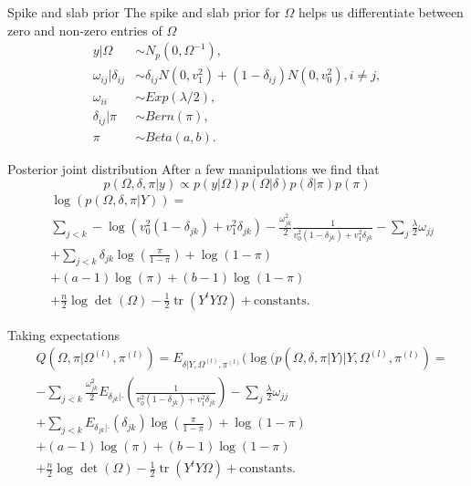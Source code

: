 \documentclass{beamer}
\DeclareMathOperator{\tr}{tr}
\begin{document}
\begin{frame}{Spike and slab prior}
	The spike and slab prior for $\Omega$ helps us differentiate between zero
	and non-zero entries of $\Omega$
	\begin{align*}
		y | \Omega                & \sim N_p(0, \Omega^{-1}),                                               \\
		\omega_{ij} | \delta_{ij} & \sim \delta_{ij} N(0, v_1^2) + (1 - \delta_{ij}) N(0, v_0^2), i \neq j, \\
		\omega_{ii}               & \sim Exp(\lambda/2),                                                    \\
		\delta_{ij} | \pi         & \sim Bern(\pi),                                                         \\
		\pi                       & \sim Beta(a,b).
	\end{align*}
\end{frame}
\begin{frame}{Posterior joint distribution}
	After a few manipulations we find that
	\[ p(\Omega, \delta, \pi | y) \propto p(y | \Omega) p(\Omega | \delta) p(\delta | \pi) p(\pi) \]
	\begin{align*}
		 & \log(p(\Omega, \delta, \pi | Y)) =                                   \\
		 & \sum_{j<k} -\log(v_0^2 (1 - \delta_{jk}) + v_1^2 \delta_{jk})
		- \frac{\omega_{jk}^2}{2} \frac{1}{v_0^2 (1 - \delta_{jk}) + v_1^2
		\delta_{jk}} - \sum_j \frac{\lambda}{2} \omega_{jj}                     \\
		 & + \sum_{j<k} \delta_{jk} \log\left(\frac{\pi}{1-\pi}\right) + \log(1
		- \pi)                                                                  \\
		 & + (a - 1) \log(\pi) + (b - 1) \log(1 - \pi)                          \\
		 & + \frac{n}{2} \log\det(\Omega) - \frac{1}{2} \tr(Y^t Y \Omega)
		+ \text{constants.}
	\end{align*}
\end{frame}
\begin{frame}{Taking expectations}
	\begin{align*}
		 & Q(\Omega, \pi | \Omega^{(l)}, \pi^{(l)}) = E_{\delta | Y, \Omega^{(l)},
		\pi^{(l)}}(\log(p(\Omega, \delta, \pi | Y) | Y, \Omega^{(l)}, \pi^{(l)} ) =                                   \\
		 & - \sum_{j<k} \frac{\omega_{jk}^2}{2} E_{\delta_{jk} | \cdot}\left(\frac{1}{v_0^2 (1 - \delta_{jk}) + v_1^2
		\delta_{jk}}\right) - \sum_j \frac{\lambda}{2} \omega_{jj}                                                    \\
		 & + \sum_{j<k} E_{\delta_{jk} | \cdot}(\delta_{jk}) \log\left(\frac{\pi}{1-\pi}\right) + \log(1
		- \pi)                                                                                                        \\
		 & + (a - 1) \log(\pi) + (b - 1) \log(1 - \pi)                                                                \\
		 & + \frac{n}{2} \log\det(\Omega) - \frac{1}{2} \tr(Y^t Y \Omega)
		+ \text{constants.}
	\end{align*}
\end{frame}
\end{document}
